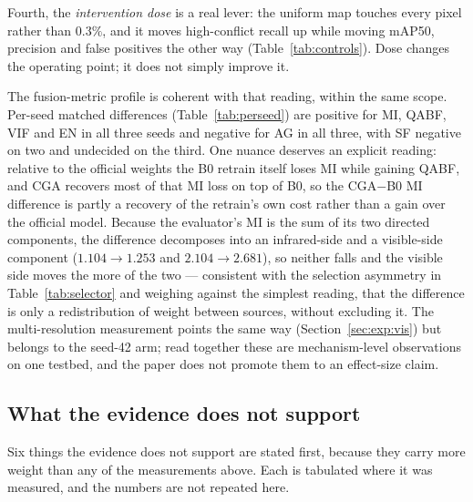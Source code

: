 \documentclass[pdflatex,sn-mathphys-num]{sn-jnl}
\theoremstyle{thmstyleone}%
\theoremstyle{thmstyletwo}%
\theoremstyle{thmstylethree}%
\begin{document}
Fourth, the \emph{intervention dose} is a real lever: the uniform map touches every pixel rather than $0.3\%$, and it moves high-conflict recall up while moving mAP50, precision and false positives the other way (Table~\ref{tab:controls}). Dose changes the operating point; it does not simply improve it.

The fusion-metric profile is coherent with that reading, within the same scope. Per-seed matched differences (Table~\ref{tab:perseed}) are positive for MI, QABF, VIF and EN in all three seeds and negative for AG in all three, with SF negative on two and undecided on the third. One nuance deserves an explicit reading: relative to the official weights the B0 retrain itself loses MI while gaining QABF, and CGA recovers most of that MI loss on top of B0, so the CGA$-$B0 MI difference is partly a recovery of the retrain's own cost rather than a gain over the official model. Because the evaluator's MI is the sum of its two directed components, the difference decomposes into an infrared-side and a visible-side component ($1.104 \to 1.253$ and $2.104 \to 2.681$), so neither falls and the visible side moves the more of the two --- consistent with the selection asymmetry in Table~\ref{tab:selector} and weighing against the simplest reading, that the difference is only a redistribution of weight between sources, without excluding it. The multi-resolution measurement points the same way (Section~\ref{sec:exp:vis}) but belongs to the seed-42 arm; read together these are mechanism-level observations on one testbed, and the paper does not promote them to an effect-size claim.

\subsection{What the evidence does not support}\label{sec:discussion:notsupport}

Six things the evidence does not support are stated first, because they carry more weight than any of the measurements above. Each is tabulated where it was measured, and the numbers are not repeated here.
\end{document}
